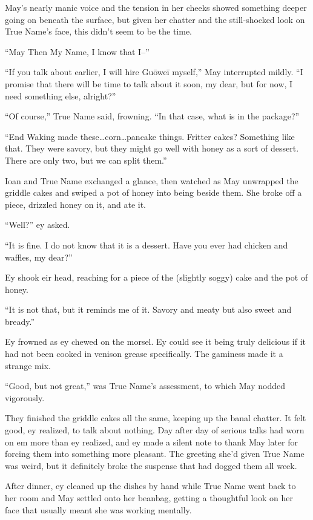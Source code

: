 May's nearly manic voice and the tension in her cheeks showed something deeper going on beneath the surface, but given her chatter and the still-shocked look on True Name's face, this didn't seem to be the time.

``May Then My Name, I know that I--''

``If you talk about earlier, I will hire Guōweī myself,'' May interrupted mildly. ``I promise that there will be time to talk about it soon, my dear, but for now, I need something else, alright?''

``Of course,'' True Name said, frowning. ``In that case, what is in the package?''

``End Waking made these\ldots corn\ldots pancake things. Fritter cakes? Something like that. They were savory, but they might go well with honey as a sort of dessert. There are only two, but we can split them.''

Ioan and True Name exchanged a glance, then watched as May unwrapped the griddle cakes and swiped a pot of honey into being beside them. She broke off a piece, drizzled honey on it, and ate it.

``Well?'' ey asked.

``It is fine. I do not know that it is a dessert. Have you ever had chicken and waffles, my dear?''

Ey shook eir head, reaching for a piece of the (slightly soggy) cake and the pot of honey.

``It is not that, but it reminds me of it. Savory and meaty but also sweet and bready.''

Ey frowned as ey chewed on the morsel. Ey could see it being truly delicious if it had not been cooked in venison grease specifically. The gaminess made it a strange mix.

``Good, but not great,'' was True Name's assessment, to which May nodded vigorously.

They finished the griddle cakes all the same, keeping up the banal chatter. It felt good, ey realized, to talk about nothing. Day after day of serious talks had worn on em more than ey realized, and ey made a silent note to thank May later for forcing them into something more pleasant. The greeting she'd given True Name was weird, but it definitely broke the suspense that had dogged them all week.

After dinner, ey cleaned up the dishes by hand while True Name went back to her room and May settled onto her beanbag, getting a thoughtful look on her face that usually meant she was working mentally.

